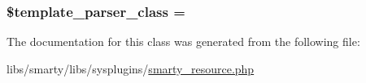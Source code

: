 \subsubsection[{\$template\+\_\+parser\+\_\+class}]{\setlength{\rightskip}{0pt plus 5cm}\$template\+\_\+parser\+\_\+class = \textquotesingle{}}\label{class_smarty___resource_a5861bfb4f75ed665b42ce8eba8ae51f8}


The documentation for this class was generated from the following file\+:\begin{DoxyCompactItemize}
\item 
libs/smarty/libs/sysplugins/\hyperlink{smarty__resource_8php}{smarty\+\_\+resource.\+php}\end{DoxyCompactItemize}
